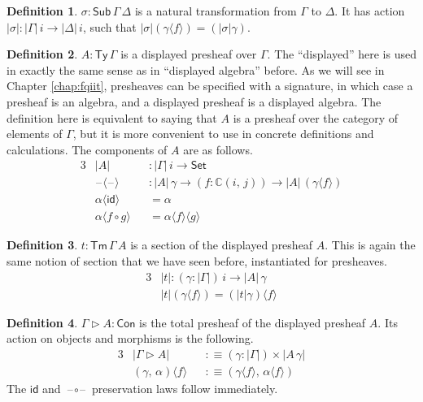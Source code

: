 \documentclass[12pt,a4paper,twoside,openany]{book}
\theoremstyle{remark}
\theoremstyle{definition}
\newtheorem{mydefinition}{Definition}
\theoremstyle{theorem}
\newcommand{\mbb}[1]{\mathbb{#1}}
\newcommand{\id}{\mathsf{id}}
\newcommand{\Con}{\mathsf{Con}}
\newcommand{\Sub}{\mathsf{Sub}}
\newcommand{\Tm}{\mathsf{Tm}}
\newcommand{\Ty}{\mathsf{Ty}}
\newcommand{\blank}{\mathord{\hspace{1pt}\text{--}\hspace{1pt}}}
\newcommand{\Set}{\mathsf{Set}}
\newcommand{\ext}{\triangleright}
\newcommand{\mbbC}{\mbb{C}}
\newcommand{\lab}{\langle}
\newcommand{\rab}{\rangle}
\newcommand{\defn}{:\equiv}
\begin{document}
\begin{mydefinition}
$\sigma : \Sub\,\Gamma\,\Delta$ is a natural transformation from $\Gamma$ to
$\Delta$. It has action $|\sigma| : |\Gamma|\,i \to |\Delta|\,i$, such that
$|\sigma|(\gamma\lab f \rab) = (|\sigma|\gamma)$.
\end{mydefinition}

\begin{mydefinition}
\label{def:presheaf-type}
$A : \Ty\,\Gamma$ is a displayed presheaf over $\Gamma$. The
``displayed'' here is used in exactly the same sense as in ``displayed
algebra'' before. As we will see in Chapter \ref{chap:fqiit}, presheaves can be
specified with a signature, in which case a presheaf is an algebra, and a
displayed presheaf is a displayed algebra. The definition here is equivalent
to saying that $A$ is a presheaf over the category of elements of $\Gamma$,
but it is more convenient to use in concrete definitions and calculations. The
components of $A$ are as follows.
\begin{alignat*}{3}
  &|A| &&: |\Gamma|\,i \to \Set\\
  &\blank\lab\blank\rab &&: |A|\,\gamma \to (f : \mbbC(i,\,j)) \to |A|\,(\gamma\lab f \rab)\\
  & \alpha\lab\id\rab &&= \alpha \\
  & \alpha\lab f\circ g\rab &&= \alpha \lab f \rab \lab g \rab
\end{alignat*}
\end{mydefinition}

\begin{mydefinition}
$t : \Tm\,\Gamma\,A$ is a section of the displayed presheaf $A$. This is
again the same notion of section that we have seen before, instantiated for
presheaves.
\begin{alignat*}{3}
  & |t| : (\gamma : |\Gamma|)\,i \to |A|\,\gamma \\
  & |t|(\gamma\lab f \rab) = (|t|\gamma)\lab f \rab
\end{alignat*}
\end{mydefinition}

\begin{mydefinition}
$\Gamma \ext A : \Con$ is the total presheaf of the displayed presheaf $A$. Its action on objects and morphisms is the following.
\begin{alignat*}{3}
  &|\Gamma \ext A| &&\defn (\gamma : |\Gamma|) \times |A\,\gamma|\\
  &(\gamma,\,\alpha)\lab f \rab &&\defn (\gamma\lab f \rab,\, \alpha\lab f \rab)
\end{alignat*}
The $\id$ and $\blank\!\circ\!\blank$ preservation laws follow immediately.
\end{mydefinition}
\end{document}
